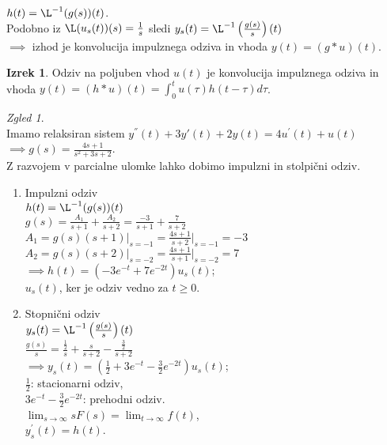 \documentclass[a4paper, 12pt]{book}
\theoremstyle{definition}
\newtheorem{theorem}[counter]{Izrek}
\theoremstyle{remark}
\newtheorem*{exmp}{Zgled}
\begin{document}
$h(t) = \L^{-1}(g(s))(t)$. \\
Podobno iz $\L(u_s(t))(s) = \frac{1}{s}$ sledi $y_s(t) =
\L^{-1}\left(\frac{g(s)}{s}\right)(t)$ \\
$\implies$ izhod je konvolucija impulznega odziva in vhoda $y(t) = (g * u)(t)$.
\begin{theorem}
    Odziv na poljuben vhod $u(t)$ je konvolucija impulznega odziva in vhoda
    $y(t) = (h * u)(t) = \int_0^t u(\tau) h(t-\tau) d\tau$.
\end{theorem}
\begin{exmp} \text{} \\
    Imamo relaksiran sistem $y^{''}(t) + 3 y{'}(t) + 2 y(t) = 4 u^{'}(t) + u(t)$ \\
    $\implies g(s) = \frac{4s+1}{s^2+3s+2}$. \\
    Z razvojem v parcialne ulomke lahko dobimo impulzni in stolpični odziv.
    \begin{enumerate}[label=\alph*)]
        \item Impulzni odziv \\
            $h(t) = \L^{-1}(g(s))(t)$ \\
            $g(s) = \frac{A_1}{s+1} + \frac{A_2}{s+2} = \frac{-3}{s+1} + \frac{7}{s+2}$ \\
            $A_1 = g(s) (s+1) \vert_{s=-1} = \frac{4s+1}{s+2} \vert_{s=-1} = -3$ \\
            $A_2 = g(s) (s+2) \vert_{s=-2} = \frac{4s+1}{s+1} \vert_{s=-2} = 7$ \\
            $\implies h(t) = \left( -3e^{-t} + 7e^{-2t}\right) u_s(t)$; \\
            $u_s(t)$, ker je odziv vedno za $t \geq 0$.
        \item Stopnični odziv \\
            $y_s(t) = \L^{-1}\left(\frac{g(s)}{s}\right)(t)$ \\
            $\frac{g(s)}{s} = \frac{\frac{1}{2}}{s} + \frac{s}{s+2} - \frac{\frac{3}{2}}{s+2}$ \\
            $\implies y_s(t) = \left(\frac{1}{2} + 3 e^{-t} - \frac{3}{2} e^{-2t}\right) u_s(t)$; \\
            $\frac{1}{2}$: stacionarni odziv, \\
            $3e^{-t} - \frac{3}{2} e^{-2t}$: prehodni odziv. \\
            $\lim_{s \to \infty} s F(s) = \lim_{t \to \infty} f(t)$, \\
            $y_s^{'}(t) = h(t)$.
    \end{enumerate}
\end{exmp}
\end{document}
